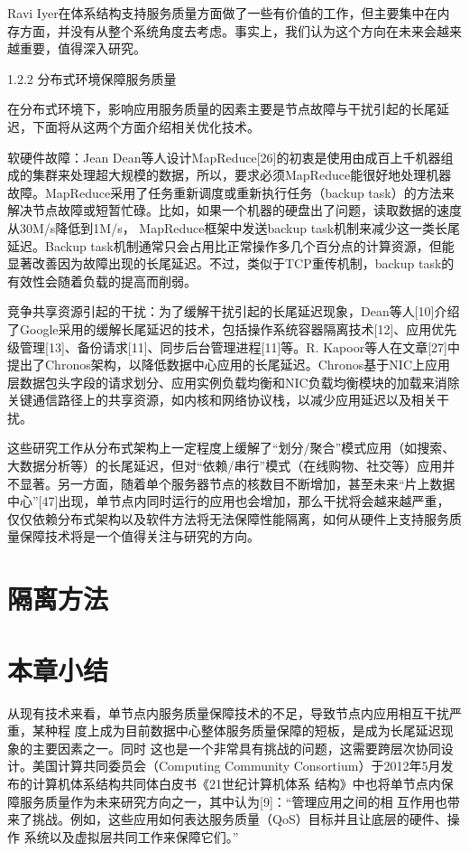 Ravi Iyer在体系结构支持服务质量方面做了一些有价值的工作，但主要集中在内存方面，并没有从整个系统角度去考虑。事实上，我们认为这个方向在未来会越来越重要，值得深入研究。
 
1.2.2 分布式环境保障服务质量

在分布式环境下，影响应用服务质量的因素主要是节点故障与干扰引起的长尾延迟，下面将从这两个方面介绍相关优化技术。

软硬件故障：Jean Dean等人设计MapReduce[26]的初衷是使用由成百上千机器组成的集群来处理超大规模的数据，所以，要求必须MapReduce能很好地处理机器故障。MapReduce采用了任务重新调度或重新执行任务（backup task）的方法来解决节点故障或短暂忙碌。比如，如果一个机器的硬盘出了问题，读取数据的速度从30M/s降低到1M/s， MapReduce框架中发送backup task机制来减少这一类长尾延迟。Backup task机制通常只会占用比正常操作多几个百分点的计算资源，但能显著改善因为故障出现的长尾延迟。不过，类似于TCP重传机制，backup task的有效性会随着负载的提高而削弱。


竞争共享资源引起的干扰：为了缓解干扰引起的长尾延迟现象，Dean等人[10]介绍了Google采用的缓解长尾延迟的技术，包括操作系统容器隔离技术[12]、应用优先级管理[13]、备份请求[11]、同步后台管理进程[11]等。R. Kapoor等人在文章[27]中提出了Chronos架构，以降低数据中心应用的长尾延迟。Chronos基于NIC上应用层数据包头字段的请求划分、应用实例负载均衡和NIC负载均衡模块的加载来消除关键通信路径上的共享资源，如内核和网络协议栈，以减少应用延迟以及相关干扰。

这些研究工作从分布式架构上一定程度上缓解了“划分/聚合”模式应用（如搜索、大数据分析等）的长尾延迟，但对“依赖/串行”模式（在线购物、社交等）应用并不显著。另一方面，随着单个服务器节点的核数目不断增加，甚至未来“片上数据中心”[47]出现，单节点内同时运行的应用也会增加，那么干扰将会越来越严重，仅仅依赖分布式架构以及软件方法将无法保障性能隔离，如何从硬件上支持服务质量保障技术将是一个值得关注与研究的方向。


\section{隔离方法}
\label{sec:multifig}


\section{本章小结}

从现有技术来看，单节点内服务质量保障技术的不足，导致节点内应用相互干扰严重，某种程
度上成为目前数据中心整体服务质量保障的短板，是成为长尾延迟现象的主要因素之一。同时
这也是一个非常具有挑战的问题，这需要跨层次协同设计。美国计算共同委员会（Computing 
Community Consortium）于2012年5月发布的计算机体系结构共同体白皮书《21世纪计算机体系
结构》中也将单节点内保障服务质量作为未来研究方向之一，其中认为[9]：“管理应用之间的相
互作用也带来了挑战。例如，这些应用如何表达服务质量（QoS）目标并且让底层的硬件、操作
系统以及虚拟层共同工作来保障它们。”

